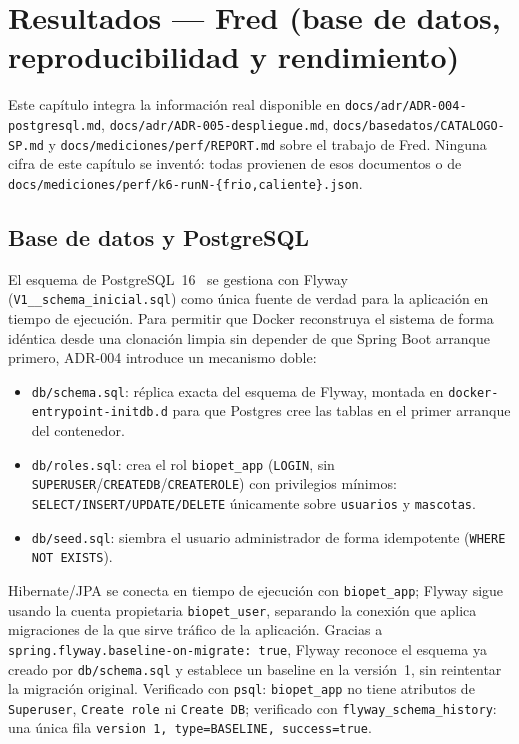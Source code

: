 \chapter{Resultados --- Fred (base de datos, reproducibilidad y rendimiento)}
\label{cap:resultados-fred}

Este cap\'itulo integra la informaci\'on real disponible en
\texttt{docs/adr/ADR-004-postgresql.md},
\texttt{docs/adr/ADR-005-despliegue.md},
\texttt{docs/basedatos/CATALOGO-SP.md} y
\texttt{docs/mediciones/perf/REPORT.md} sobre el trabajo de Fred. Ninguna
cifra de este cap\'itulo se invent\'o: todas provienen de esos documentos o
de \texttt{docs/mediciones/perf/k6-runN-\{frio,caliente\}.json}.

\section{Base de datos y PostgreSQL}

El esquema de PostgreSQL~16~\cite{postgresql-docs} se gestiona con Flyway
(\texttt{V1__schema_inicial.sql}) como \'unica fuente de verdad para la
aplicaci\'on en tiempo de ejecuci\'on. Para permitir que Docker reconstruya
el sistema de forma id\'entica desde una clonaci\'on limpia sin depender de
que Spring Boot arranque primero, ADR-004 introduce un mecanismo doble:

\begin{itemize}[nosep]
  \item \texttt{db/schema.sql}: r\'eplica exacta del esquema de Flyway,
    montada en \texttt{docker-entrypoint-initdb.d} para que Postgres cree
    las tablas en el primer arranque del contenedor.
  \item \texttt{db/roles.sql}: crea el rol \texttt{biopet_app}
    (\texttt{LOGIN}, sin \texttt{SUPERUSER}/\texttt{CREATEDB}/\texttt{CREATEROLE})
    con privilegios m\'inimos: \texttt{SELECT/INSERT/UPDATE/DELETE}
    \'unicamente sobre \texttt{usuarios} y \texttt{mascotas}.
  \item \texttt{db/seed.sql}: siembra el usuario administrador de forma
    idempotente (\texttt{WHERE NOT EXISTS}).
\end{itemize}

Hibernate/JPA se conecta en tiempo de ejecuci\'on con \texttt{biopet_app};
Flyway sigue usando la cuenta propietaria \texttt{biopet_user}, separando
la conexi\'on que aplica migraciones de la que sirve tr\'afico de la
aplicaci\'on. Gracias a \texttt{spring.flyway.baseline-on-migrate: true},
Flyway reconoce el esquema ya creado por \texttt{db/schema.sql} y establece
un baseline en la versi\'on~1, sin reintentar la migraci\'on original.
Verificado con \texttt{psql}: \texttt{biopet_app} no tiene atributos de
\texttt{Superuser}, \texttt{Create role} ni \texttt{Create DB}; verificado
con \texttt{flyway_schema_history}: una \'unica fila
\texttt{version~1, type=BASELINE, success=true}.

